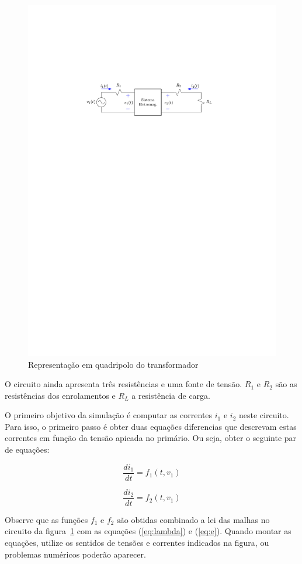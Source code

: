 \documentclass[a4paper]{article}
\theoremstyle{definition}
\theoremstyle{plain}
\begin{document}
\begin{figure}[H]
\centering
\includegraphics[width=0.75\linewidth]{../../Figuras/Trafo_mono_sistema_eletromag.pdf}
\caption{Representação em quadripolo do transformador}
\label{fig:trafo:quadri}
\end{figure}


O circuito ainda apresenta três resistências e uma fonte de tensão. $R_1$ e $R_2$ são as resistências dos enrolamentos e $R_L$ a resistência de carga.  

O primeiro objetivo da simulação é computar as correntes $i_1$ e $i_2$ neste circuito. Para isso, o primeiro passo é obter duas equações diferencias que descrevam estas correntes em função da tensão apicada no primário. Ou seja, obter o seguinte par de equações:

\begin{equation}
\frac{d i_1}{dt} = f_1(t,v_1)
\end{equation} 

\begin{equation}
\frac{d i_2}{dt} = f_2(t,v_1)
\end{equation} 

Observe que as funções $f_1$ e $f_2$ são obtidas combinado a lei das malhas no circuito da figura~\ref{fig:trafo:quadri} com as equações (\ref{eq:lambda}) e (\ref{eq:e}). Quando montar as equações, utilize os sentidos de tensões e correntes indicados na figura, ou problemas numéricos poderão aparecer.
\end{document}

